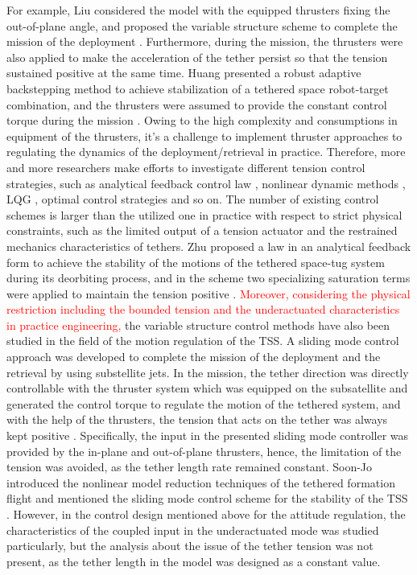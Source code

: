 \documentclass[3p]{elsarticle}
\theoremstyle{plain}
\begin{document}
For example, Liu considered the model with the equipped thrusters fixing the out-of-plane angle, and proposed the variable structure scheme to complete the mission of the deployment \cite{yingying2012variable}. Furthermore, during the mission, the thrusters were also applied to make the acceleration of the tether persist so that the tension sustained positive at the same time. Huang presented a robust adaptive backstepping method to achieve stabilization of a tethered space robot-target combination, and the thrusters were assumed to provide the constant control torque during the mission \cite{huang2015adaptive}. Owing to the high complexity and consumptions in equipment of the thrusters, it's a challenge to implement thruster approaches to regulating the dynamics of the deployment/retrieval in practice. Therefore, more and more researchers make efforts to investigate different tension control strategies, such as analytical feedback control law \cite{wen2015space}, nonlinear dynamic methods \cite{jung2015nonlinear}, LQG \cite{yousefian2015anti}, optimal control strategies \cite{steindl2015optimal,Williams2009745} and so on. The number of existing control schemes is larger than the utilized one in practice with respect to strict physical constraints, such as the limited output of a tension actuator and the restrained mechanics characteristics of tethers. Zhu proposed a law in an analytical feedback form to achieve the stability of the motions of the tethered space-tug system during its deorbiting process, and in the scheme two specializing saturation terms were applied to maintain the tension positive \cite{wen2016constrained}. \textcolor{red}{Moreover, considering the physical restriction including the bounded tension and the underactuated characteristics in practice engineering,} the variable structure control methods have also been studied in the field of the motion regulation of the TSS. A sliding mode control approach was developed to complete the mission of the deployment and the retrieval by using substellite jets. In the mission, the tether direction was directly controllable with the thruster system which was equipped on the subsatellite and generated the control torque to regulate the motion of the tethered system, and with the help of the thrusters, the tension that acts on the tether was always kept positive \cite{yingying2012variable}.
Specifically, the input in the presented sliding mode controller was provided by the in-plane and out-of-plane thrusters, hence, the limitation of the tension was avoided, as the tether length rate remained constant. Soon-Jo introduced the nonlinear model reduction techniques of the tethered formation flight and mentioned the sliding mode control scheme for the stability of the TSS \cite{chung2007nonlinear,chung2008propellant2}. However, in the control design mentioned above for the attitude regulation, the characteristics of the coupled input in the underactuated mode was studied particularly, but the analysis about the issue of the tether tension was not present, as the tether length in the model was designed as a constant value.\par
\end{document}
